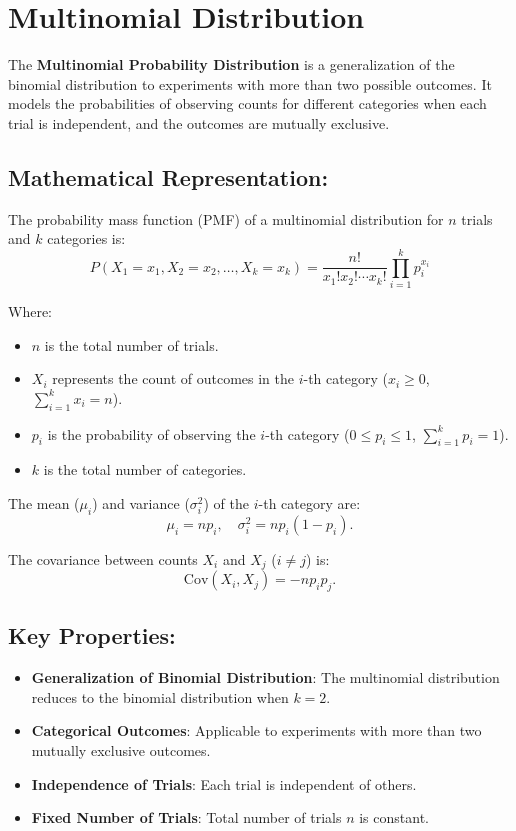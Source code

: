 \section{Multinomial Distribution}
The \textbf{Multinomial Probability Distribution} is a generalization of the binomial distribution to experiments with more than two possible outcomes. It models the probabilities of observing counts for different categories when each trial is independent, and the outcomes are mutually exclusive.

\subsection*{Mathematical Representation:}
The probability mass function (PMF) of a multinomial distribution for $n$ trials and $k$ categories is:
\[
    P(X_1 = x_1, X_2 = x_2, \ldots, X_k = x_k) = \frac{n!}{x_1! x_2! \cdots x_k!} \prod_{i=1}^k p_i^{x_i}
\]

Where:
\begin{itemize}
    \item $n$ is the total number of trials.
    \item $X_i$ represents the count of outcomes in the $i$-th category ($x_i \geq 0$, $\sum_{i=1}^k x_i = n$).
    \item $p_i$ is the probability of observing the $i$-th category ($0 \leq p_i \leq 1$, $\sum_{i=1}^k p_i = 1$).
    \item $k$ is the total number of categories.
\end{itemize}

The mean ($\mu_i$) and variance ($\sigma_i^2$) of the $i$-th category are:
\[
    \mu_i = n p_i, \quad \sigma_i^2 = n p_i (1 - p_i).
\]

The covariance between counts $X_i$ and $X_j$ ($i \neq j$) is:
\[
    \text{Cov}(X_i, X_j) = -n p_i p_j.
\]

\subsection*{Key Properties:}
\begin{itemize}
    \item \textbf{Generalization of Binomial Distribution}: The multinomial distribution reduces to the binomial distribution when $k = 2$.
    \item \textbf{Categorical Outcomes}: Applicable to experiments with more than two mutually exclusive outcomes.
    \item \textbf{Independence of Trials}: Each trial is independent of others.
    \item \textbf{Fixed Number of Trials}: Total number of trials $n$ is constant.
\end{itemize}

